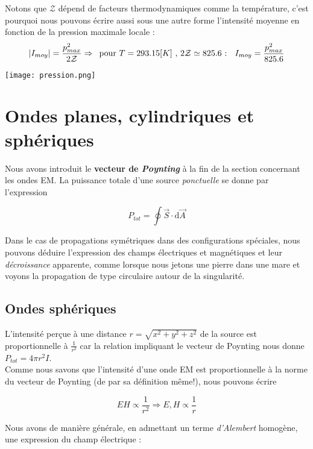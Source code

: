 Notons que $\mathcal{Z}$ dépend de facteurs thermodynamiques comme la température, c'est pourquoi nous pouvons écrire aussi sous une autre forme l'intensité moyenne en fonction de
la pression maximale locale : 
\[ |I_{moy}| = \frac{p_{max}^{2}}{2 \mathcal{Z}} \Rightarrow \hspace{5pt} \mbox{pour $T = 293.15[K]$ , $ 2 \mathcal{Z} \simeq 825.6$  : } \hspace{5pt} I_{moy} = \frac{p_{max}^{2}}{825.6}\]

\begin{center}
	\texttt{[image: pression.png]}
\end{center}

\section{Ondes planes, cylindriques et sphériques}

Nous avons introduit le \textbf{vecteur de \textit{Poynting}} à la fin de la section concernant les ondes EM. La puissance totale d'une source \textit{ponctuelle} se donne par l'expression 

\[P_{tot} = \oint \vec{S} \cdot \mathrm{d}\vec{A}\]

Dans le cas de propagations symétriques dans des configurations spéciales, nous pouvons déduire l'expression des champs électriques et magnétiques et leur \textit{décroissance} apparente, comme 
lorsque nous jetons une pierre dans une mare et voyons la propagation de type circulaire autour de la singularité. 

\subsection{Ondes sphériques} 

L'intensité perçue à une distance $r = \sqrt{x^{2} + y^{2} + z^{2}}$ de la source est proportionnelle à $\frac{1}{r^{2}}$ car la relation impliquant le vecteur de Poynting nous 
donne $P_{tot} = 4 \pi r^{2} I$. \\ 
Comme nous savons que l'intensité d'une onde EM est proportionnelle à la norme du vecteur de Poynting (de par sa définition même!), nous pouvons écrire 

\[ EH \propto \frac{1}{r^{2}} \Rightarrow E,H \propto \frac{1}{r}\]

Nous avons de manière générale, en admettant un terme \textit{d'Alembert} homogène, une expression du champ électrique : 


